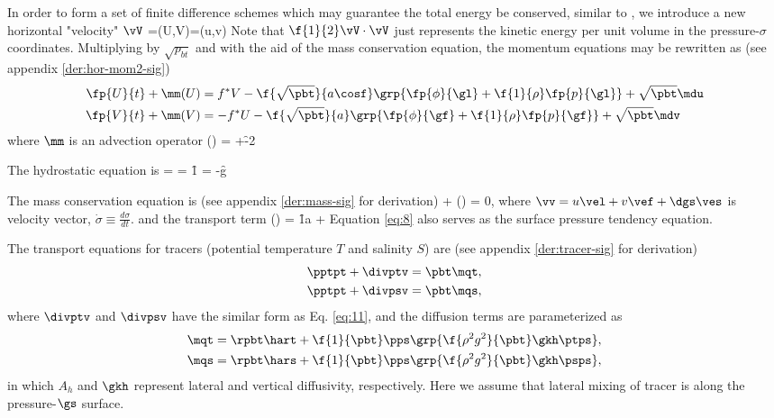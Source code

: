 In order to form a set of finite difference schemes which may guarantee
the total energy be conserved, similar to \citet{Zeng1987}, we
introduce a new horizontal "velocity" $\vV$ 
\beeq
\vV=(U,V)=(\sqrt{\pbt}u,\sqrt{\pbt}v)
\eneq
Note that $\f{1}{2}\vV\cdot\vV$ just represents
the kinetic energy per unit volume in the pressure-$\sigma$ coordinates.
Multiplying by $\sqrt{p_{bt}}$ and with the aid of the mass conservation
equation, the momentum equations may be rewritten as 
(see appendix \ref{der:hor-mom2-sig})
\bese
\begin{align}
  \fp{U}{t}+\mm(U) &= f^{*}V - 
  \f{\sqrt{\pbt}}{a\cosf}\grp{\fp{\phi}{\gl}+\f{1}{\rho}\fp{p}{\gl}}
  +\sqrt{\pbt}\mdu \label{eq:MultiU}\\
  \fp{V}{t}+\mm(V) &= -f^{*}U - 
  \f{\sqrt{\pbt}}{a}\grp{\fp{\phi}{\gf}+\f{1}{\rho}\fp{p}{\gf}}
  +\sqrt{\pbt}\mdv \label{eq:MultiV}
\end{align}
\ense
 where $\mm$ is an advection operator
\beeq
\mm(\mu) = \racosf {}
+\fp{(\dgs\mu)}{\gs}-\f{\mu}{2}\fp{\dgs}{\gs}
\eneq

The hydrostatic equation is
\beeq \label{eq:22}
   =  
              = \f{1}{\pbt} 
              = -\f{\rho g}{\pbt}
\eneq
 
The mass conservation equation is (see appendix \ref{der:mass-sig} for derivation)
\beeq \label{eq:8}
 + \gn \cdot (\pbt \vv) = 0,
\eneq
where $\vv = u\vel + v\vef + \dgs\ves$ is velocity vector, 
$\dot{\sigma}\equiv\frac{d\sigma}{dt}$.
and the transport term
\beeq \label{eq:11}
\gn \cdot (\pbt \vv) = \f{1}{a\cosf}  + \fp{(\pbt \dgs)}{\gs}
\eneq
Equation \ref{eq:8} also serves as the surface pressure tendency equation.

The transport equations for tracers (potential temperature $T$ and salinity $S$)
are (see appendix \ref{der:tracer-sig} for derivation)
\bese
\begin{align} \label{eq:16}
  \pptpt+\divptv &= \pbt\mqt, \\
  \pptpt+\divpsv &= \pbt\mqs,
\end{align}
\ense
where $\divptv$ and $\divpsv$ have the similar form as Eq. \ref{eq:11}, and the
diffusion terms are parameterized as
\bese \label{eq:38}
\begin{align}
  \mqt &= \rpbt\hart + \f{1}{\pbt}\pps\grp{\f{\rho^2 g^2}{\pbt} \gkh\ptps},\\
  \mqs &= \rpbt\hars + \f{1}{\pbt}\pps\grp{\f{\rho^2 g^2}{\pbt} \gkh\psps},
\end{align}
\ense
in which $A_h$ and $\gkh$ represent lateral and vertical diffusivity,
respectively. Here we assume that lateral mixing of tracer is along the
pressure-$\gs$ surface.

